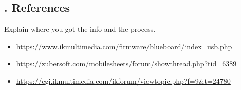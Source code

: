 \documentclass[letterpaper, 12pt]{article}
\begin{document}
\subsection*{{. References}} \justify
Explain where you got the info and the process.
\begin{itemize}
    \item \url{https://www.ikmultimedia.com/firmware/blueboard/index_usb.php}
    \item \url{https://zubersoft.com/mobilesheets/forum/showthread.php?tid=6389} 
    \item \url{https://cgi.ikmultimedia.com/ikforum/viewtopic.php?f=9&t=24780} 
\end{itemize}
\end{document}
